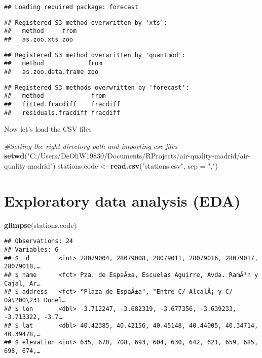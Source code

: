 \documentclass[
]{article}
\newenvironment{Shaded}{\begin{snugshade}}{\end{snugshade}}
\newcommand{\CommentTok}[1]{\textcolor[rgb]{0.56,0.35,0.01}{\textit{#1}}}
\newcommand{\DataTypeTok}[1]{\textcolor[rgb]{0.13,0.29,0.53}{#1}}
\newcommand{\KeywordTok}[1]{\textcolor[rgb]{0.13,0.29,0.53}{\textbf{#1}}}
\newcommand{\NormalTok}[1]{#1}
\newcommand{\StringTok}[1]{\textcolor[rgb]{0.31,0.60,0.02}{#1}}
\begin{document}
\begin{verbatim}
## Loading required package: forecast
\end{verbatim}

\begin{verbatim}
## Registered S3 method overwritten by 'xts':
##   method     from
##   as.zoo.xts zoo
\end{verbatim}

\begin{verbatim}
## Registered S3 method overwritten by 'quantmod':
##   method            from
##   as.zoo.data.frame zoo
\end{verbatim}

\begin{verbatim}
## Registered S3 methods overwritten by 'forecast':
##   method             from    
##   fitted.fracdiff    fracdiff
##   residuals.fracdiff fracdiff
\end{verbatim}

Now let's load the CSV files

\begin{Shaded}
\begin{Highlighting}[]
\CommentTok{#Setting the right directory path and importing csv files}
\KeywordTok{setwd}\NormalTok{(}\StringTok{"C:/Users/DeOliW19830/Documents/RProjects/air-quality-madrid/air-quality-madrid"}\NormalTok{)}
\NormalTok{stations.code <-}\StringTok{ }\KeywordTok{read.csv}\NormalTok{(}\StringTok{"stations.csv"}\NormalTok{, }\DataTypeTok{sep =} \StringTok{","}\NormalTok{)}
\end{Highlighting}
\end{Shaded}

\hypertarget{exploratory-data-analysis-eda}{%
\section{Exploratory data analysis
(EDA)}\label{exploratory-data-analysis-eda}}

\begin{Shaded}
\begin{Highlighting}[]
\KeywordTok{glimpse}\NormalTok{(stations.code)}
\end{Highlighting}
\end{Shaded}

\begin{verbatim}
## Observations: 24
## Variables: 6
## $ id        <int> 28079004, 28079008, 28079011, 28079016, 28079017, 28079018,…
## $ name      <fct> Pza. de EspaÃ±a, Escuelas Aguirre, Avda. RamÃ³n y Cajal, Ar…
## $ address   <fct> "Plaza de EspaÃ±a", "Entre C/ AlcalÃ¡ y C/ Oâ\200\231 Donel…
## $ lon       <dbl> -3.712247, -3.682319, -3.677356, -3.639233, -3.713322, -3.7…
## $ lat       <dbl> 40.42385, 40.42156, 40.45148, 40.44005, 40.34714, 40.39478,…
## $ elevation <int> 635, 670, 708, 693, 604, 630, 642, 621, 659, 685, 698, 674,…
\end{verbatim}
\end{document}
